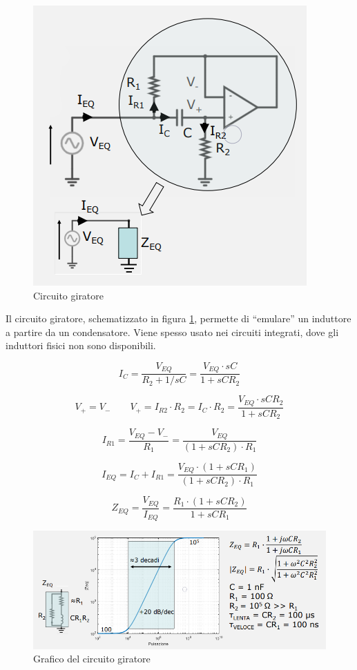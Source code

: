 \documentclass{article}
\begin{document}
\clearpage
\begin{figure}[h]
  \centering
  \includegraphics[scale=0.5]{IM_circuito_giratore}
  \caption{Circuito giratore}
  \label{Schema_circuito_giratore}
\end{figure}

Il circuito giratore, schematizzato in figura \ref{Schema_circuito_giratore}, permette di “emulare” un induttore a partire da un condensatore. Viene spesso usato nei circuiti integrati, dove gli induttori fisici non sono disponibili.

\[I_C = \frac{V_{EQ}}{R_2 + 1/sC} = \frac{V_{EQ} \cdot sC}{1 + sCR_2}\]

\[V_+ = V_-  \quad \quad V_+ = I_{R2} \cdot R_2 = I_C \cdot R_2 = \frac{V_{EQ} \cdot sCR_2}{1 + sCR_2}\]

\[I_{R1} = \frac{V_{EQ} - V_-}{R_1} = \frac{V_{EQ}}{(1 + sCR_2) \cdot R_1}\]

\[I_{EQ} = I_C + I_{R1} = \frac{V_{EQ} \cdot (1 + sCR_1)}{(1 + sCR_2) \cdot R_1}\]

\[Z_{EQ} = \frac{V_{EQ}}{I_{EQ}} = \frac{R_1 \cdot (1 + sCR_2)}{1 + sCR_1}\]

\begin{figure}[h]
  \centering
  \includegraphics[scale=0.55]{IM_circuito_giratore_grafico}
  \caption{Grafico del circuito giratore}
  \label{Schema_circuito_giratore_grafico}
\end{figure}
\end{document}
